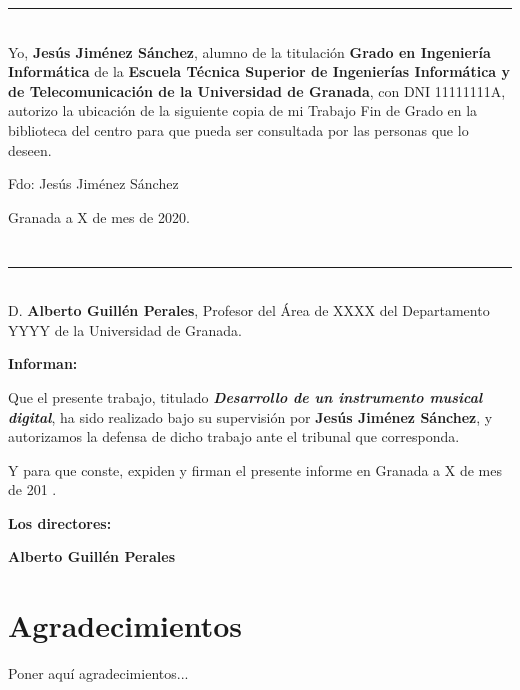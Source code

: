 \thispagestyle{empty}

\noindent\rule[-1ex]{\textwidth}{2pt}\\[4.5ex]

Yo, \textbf{Jesús Jiménez Sánchez}, alumno de la titulación \textbf{Grado en Ingeniería Informática} de la
\textbf{Escuela Técnica Superior de Ingenierías Informática y de Telecomunicación de la Universidad de Granada}, con DNI
11111111A, autorizo la ubicación de la siguiente copia de mi Trabajo Fin de Grado en la biblioteca del centro para que
pueda ser consultada por las personas que lo deseen.

\vspace{6cm}

\noindent Fdo: Jesús Jiménez Sánchez

\vspace{2cm}

\begin{flushright}
    Granada a X de mes de 2020.
\end{flushright}

\chapter*{}   %
\thispagestyle{empty}

\noindent\rule[-1ex]{\textwidth}{2pt}\\[4.5ex]

D. \textbf{Alberto Guillén Perales}, Profesor del Área de XXXX del Departamento YYYY de la Universidad de
Granada.

\vspace{0.5cm}

\textbf{Informan:}

\vspace{0.5cm}

Que el presente trabajo, titulado \textit{\textbf{Desarrollo de un instrumento musical digital}},
ha sido realizado bajo su supervisión por \textbf{Jesús Jiménez Sánchez}, y autorizamos la defensa de
dicho trabajo ante el tribunal
que corresponda.

\vspace{0.5cm}

Y para que conste, expiden y firman el presente informe en Granada a X de mes de 201 .

\vspace{1cm}

\textbf{Los directores:}

\vspace{5cm}

\noindent \textbf{Alberto Guillén Perales}

\chapter*{Agradecimientos}  %
\thispagestyle{empty}

    \vspace{1cm}


Poner aquí agradecimientos...
